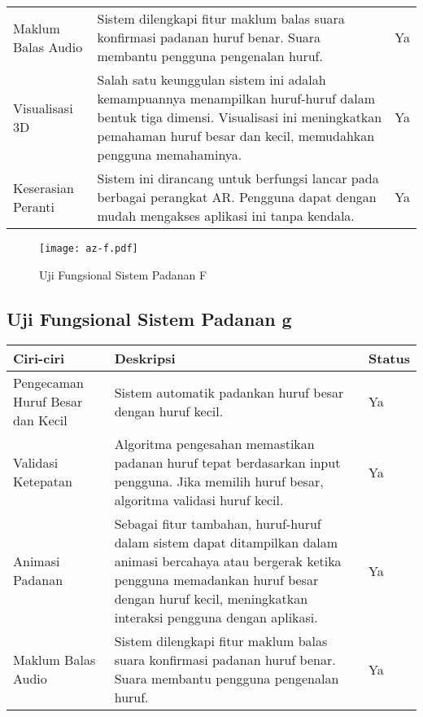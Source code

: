 \begin{itemize}
\begin{itemize}
\begin{itemize}
\begin{itemize}
\begin{itemize}
\begin{itemize}
\begin{itemize}
\begin{itemize}
\begin{flushleft}
\begin{tabular}{>{\raggedright}p{3cm}p{9cm}>{\centering\arraybackslash}p{2cm}}
Maklum Balas Audio & Sistem dilengkapi fitur maklum balas suara konfirmasi padanan huruf benar. Suara membantu pengguna pengenalan huruf. & Ya \\

Visualisasi 3D & Salah satu keunggulan sistem ini adalah kemampuannya menampilkan huruf-huruf dalam bentuk tiga dimensi. Visualisasi ini meningkatkan pemahaman huruf besar dan kecil, memudahkan pengguna memahaminya. & Ya \\

Keserasian Peranti & Sistem ini dirancang untuk berfungsi lancar pada berbagai perangkat AR. Pengguna dapat dengan mudah mengakses aplikasi ini tanpa kendala. & Ya \\
\bottomrule
\end{tabular}

\begin{figure}
    \centering
    \texttt{[image: az-f.pdf]}
    \caption{Uji Fungsional  Sistem Padanan F }
    \label{fig:az-f.pdf}
\end{figure}
\clearpage


\subsection{Uji Fungsional  Sistem Padanan g }

\begin{tabular}{>{\raggedright}p{3cm}p{9cm}>{\centering\arraybackslash}p{2cm}}
\toprule
\textbf{Ciri-ciri} & \textbf{Deskripsi} & \textbf{Status} \\
\midrule
Pengecaman Huruf Besar dan Kecil & Sistem automatik padankan huruf besar dengan huruf kecil. & Ya \\

Validasi Ketepatan & Algoritma pengesahan memastikan padanan huruf tepat berdasarkan input pengguna. Jika memilih huruf besar, algoritma validasi huruf kecil. & Ya \\

Animasi Padanan & Sebagai fitur tambahan, huruf-huruf dalam sistem dapat ditampilkan dalam animasi bercahaya atau bergerak ketika pengguna memadankan huruf besar dengan huruf kecil, meningkatkan interaksi pengguna dengan aplikasi. & Ya \\

Maklum Balas Audio & Sistem dilengkapi fitur maklum balas suara konfirmasi padanan huruf benar. Suara membantu pengguna pengenalan huruf. & Ya \\


\end{tabular}
\end{flushleft}
\end{itemize}
\end{itemize}
\end{itemize}
\end{itemize}
\end{itemize}
\end{itemize}
\end{itemize}
\end{itemize}
